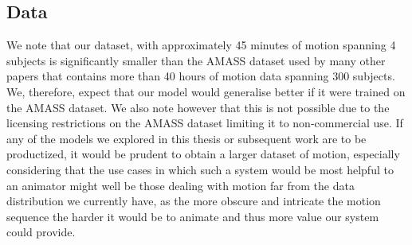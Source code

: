 \subsection{Data}
We note that our dataset, with approximately 45 minutes of motion spanning 4 subjects is significantly smaller than the AMASS \cite{amass} dataset used by many other papers that contains more than 40 hours of motion data spanning 300 subjects. We, therefore, expect that our model would generalise better if it were trained on the AMASS dataset. We also note however that this is not possible due to the licensing restrictions on the AMASS dataset limiting it to non-commercial use. If any of the models we explored in this thesis or subsequent work are to be productized, it would be prudent to obtain a larger dataset of motion, especially considering that the use cases in which such a system would be most helpful to an animator might well be those dealing with motion far from the data distribution we currently have, as the more obscure and intricate the motion sequence the harder it would be to animate and thus more value our system could provide.